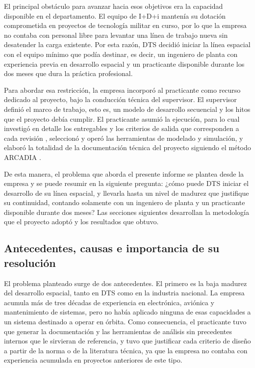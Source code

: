 El principal obstáculo para avanzar hacia esos objetivos era la capacidad disponible en el departamento. El equipo de I+D+i mantenía su dotación comprometida en proyectos de tecnología militar en curso, por lo que la empresa no contaba con personal libre para levantar una línea de trabajo nueva sin desatender la carga existente. Por esta razón, DTS decidió iniciar la línea espacial con el equipo mínimo que podía destinar, es decir, un ingeniero de planta con experiencia previa en desarrollo espacial y un practicante disponible durante los dos meses que dura la práctica profesional.

Para abordar esa restricción, la empresa incorporó al practicante como recurso dedicado al proyecto, bajo la conducción técnica del supervisor. El supervisor definió el marco de trabajo, esto es, un modelo de desarrollo secuencial y los hitos que el proyecto debía cumplir. El practicante asumió la ejecución, para lo cual investigó en detalle los entregables y los criterios de salida que corresponden a cada revisión \parencite{ieee15288-2}, seleccionó y operó las herramientas de modelado y simulación, y elaboró la totalidad de la documentación técnica del proyecto siguiendo el método ARCADIA \parencite{roques}.

De esta manera, el problema que aborda el presente informe se plantea desde la empresa y se puede resumir en la siguiente pregunta: ¿cómo puede DTS iniciar el desarrollo de su línea espacial, y llevarla hasta un nivel de madurez que justifique su continuidad, contando solamente con un ingeniero de planta y un practicante disponible durante dos meses? Las secciones siguientes desarrollan la metodología que el proyecto adoptó y los resultados que obtuvo.


\subsection{Antecedentes, causas e importancia de su resolución}

El problema planteado surge de dos antecedentes. El primero es la baja madurez del desarrollo espacial, tanto en DTS como en la industria nacional. La empresa acumula más de tres décadas de experiencia en electrónica, aviónica y mantenimiento de sistemas, pero no había aplicado ninguna de esas capacidades a un sistema destinado a operar en órbita. Como consecuencia, el practicante tuvo que generar la documentación y las herramientas de análisis sin precedentes internos que le sirvieran de referencia, y tuvo que justificar cada criterio de diseño a partir de la norma o de la literatura técnica, ya que la empresa no contaba con experiencia acumulada en proyectos anteriores de este tipo.

